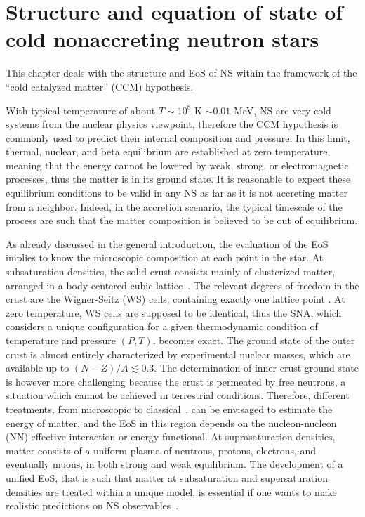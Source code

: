 %

\chapter{Structure and equation of state of cold nonaccreting neutron stars}

This chapter deals with the structure and EoS of NS within the framework of 
the ``cold catalyzed matter'' (CCM) hypothesis.

With typical temperature of about $T \sim 10^8$ K $\sim 0.01$ MeV, NS are 
very cold systems from the nuclear physics viewpoint, therefore the CCM hypothesis 
is commonly used to predict their internal composition and pressure. In this 
limit, thermal, nuclear, and beta equilibrium are established at zero
temperature, meaning that the energy cannot be lowered by weak, strong, or 
electromagnetic processes, thus the matter is in its ground state. It is 
reasonable to expect these equilibrium conditions to be valid in any NS as far 
as it is not accreting matter from a neighbor. Indeed, in the accretion 
scenario, the typical timescale of the process are such that the matter
composition is believed to be out of equilibrium.

As already discussed in the general introduction, the evaluation of the
EoS implies to know the microscopic composition at each point in the
star. At subsaturation densities, the solid crust consists mainly of 
clusterized matter, arranged in a body-centered cubic lattice~\cite{Haensel2007}. 
The relevant degrees of freedom in the crust are the Wigner-Seitz (WS) 
cells, containing exactly one lattice point \cite{Wigner1933}. At zero
temperature, WS cells are supposed to be identical, thus the SNA, which 
considers a unique configuration for a given 
thermodynamic condition of temperature and pressure $(P,T)$, becomes exact. The 
ground state of the outer crust is almost entirely characterized by experimental 
nuclear masses, which are available up to $(N-Z)/A \lesssim 0.3$. The 
determination of inner-crust ground state is however more challenging because 
the crust is permeated by free neutrons, a situation which cannot be achieved
in terrestrial conditions. Therefore, different treatments, from 
microscopic \cite{Negele1973} to classical~\cite{BBP}, can be envisaged to
estimate the energy of matter, and the EoS in this region depends on the 
nucleon-nucleon (NN) effective interaction or energy functional. At 
suprasaturation densities, matter consists of a uniform plasma of neutrons, 
protons, electrons, and eventually muons, in both strong and weak equilibrium. 
The development of a unified EoS, that is such that 
matter at subsaturation and supersaturation densities are treated within a
unique model, is essential if one wants to make realistic predictions on NS
observables~\cite{Fortin2016}.

